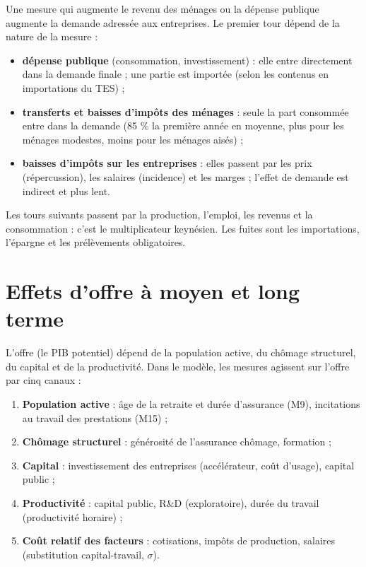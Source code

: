 \documentclass[
  11pt,
  11pt,
  a4paper,
  openany]{book}
\providecommand{\tightlist}{%
  \setlength{\itemsep}{0pt}\setlength{\parskip}{0pt}}
\begin{document}
Une mesure qui augmente le revenu des ménages ou la dépense publique
augmente la demande adressée aux entreprises. Le premier tour dépend de
la nature de la mesure :

\begin{itemize}
\tightlist
\item
  \textbf{dépense publique} (consommation, investissement) : elle entre
  directement dans la demande finale ; une partie est importée (selon
  les contenus en importations du TES) ;
\item
  \textbf{transferts et baisses d'impôts des ménages} : seule la part
  consommée entre dans la demande (85 \% la première année en moyenne,
  plus pour les ménages modestes, moins pour les ménages aisés) ;
\item
  \textbf{baisses d'impôts sur les entreprises} : elles passent par les
  prix (répercussion), les salaires (incidence) et les marges ; l'effet
  de demande est indirect et plus lent.
\end{itemize}

Les tours suivants passent par la production, l'emploi, les revenus et
la consommation : c'est le multiplicateur keynésien. Les fuites sont les
importations, l'épargne et les prélèvements obligatoires.

\hypertarget{sec:offre-lt}{%
\section{Effets d'offre à moyen et long terme}\label{sec:offre-lt}}

L'offre (le PIB potentiel) dépend de la population active, du chômage
structurel, du capital et de la productivité. Dans le modèle, les
mesures agissent sur l'offre par cinq canaux :

\begin{enumerate}
\def\labelenumi{\arabic{enumi}.}
\tightlist
\item
  \textbf{Population active} : âge de la retraite et durée d'assurance
  (M9), incitations au travail des prestations (M15) ;
\item
  \textbf{Chômage structurel} : générosité de l'assurance chômage,
  formation ;
\item
  \textbf{Capital} : investissement des entreprises (accélérateur, coût
  d'usage), capital public ;
\item
  \textbf{Productivité} : capital public, R\&D (exploratoire), durée du
  travail (productivité horaire) ;
\item
  \textbf{Coût relatif des facteurs} : cotisations, impôts de
  production, salaires (substitution capital-travail, \(\sigma\)).
\end{enumerate}
\end{document}
